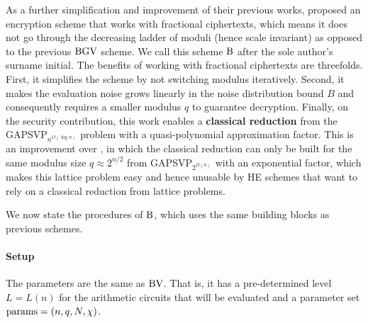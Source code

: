 \documentclass[../main.tex]{subfiles}
\begin{document}
As a further simplification and improvement of their previous works, \cite{brakerski2012fully} proposed an encryption scheme that works with fractional ciphertexts, which means it does not go through the decreasing ladder of moduli (hence scale invariant) as opposed to the previous $\text{BGV}$ scheme. We call this scheme $\text{B}$ after the sole author's surname initial. The benefits of working with fractional ciphertexts are threefolds. First, it simplifies the scheme by not switching modulus iteratively. Second, it makes the evaluation noise grows linearly in the noise distribution bound $B$ and consequently requires a smaller modulus $q$ to guarantee decryption. Finally, on the security contribution, this work enables a \textbf{classical reduction} from the GAPSVP$_{n^{O(\log n)}}$ problem with a quasi-polynomial approximation factor. This is an improvement over \cite{peikert2009public}, in which the classical reduction can only be built for the same modulus size $q \approx 2^{n/2}$ from GAPSVP$_{2^{\Omega(n)}}$ with an exponential factor, which makes this lattice problem easy and hence unusable by HE schemes that want to rely on a classical reduction from lattice problems. 

We now state the procedures of $\text{B}$, which uses the same building blocks as previous schemes.  
\paragraph{Setup} The parameters are the same as $\text{BV}$. That is, it has a pre-determined level $L=L(n)$ for the arithmetic circuits that will be evaluated and a parameter set $\text{params}=(n,q,N,\chi)$.
\end{document}

